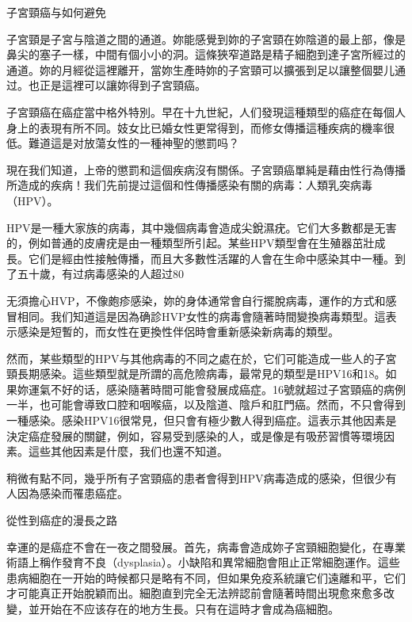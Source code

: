 \documentclass[12pt,UTF8]{ctexbook}
\begin{document}
子宮頸癌与如何避免




子宮頸是子宮与陰道之間的通道。妳能感覺到妳的子宮頸在妳陰道的最上部，像是鼻尖的塞子一樣，中間有個小小的洞。這條狹窄道路是精子細胞到達子宮所經过的通道。妳的月經從這裡離开，當妳生產時妳的子宮頸可以擴張到足以讓整個嬰儿通过。也正是這裡可以讓妳得到子宮頸癌。

子宮頸癌在癌症當中格外特別。早在十九世紀，人们發現這種類型的癌症在每個人身上的表現有所不同。妓女比已婚女性更常得到，而修女傳播這種疾病的機率很低。難道這是对放蕩女性的一種神聖的懲罰吗？

現在我们知道，上帝的懲罰和這個疾病沒有關係。子宮頸癌單純是藉由性行為傳播所造成的疾病！我们先前提过這個和性傳播感染有關的病毒：人類乳突病毒（HPV）。

HPV是一種大家族的病毒，其中幾個病毒會造成尖銳濕疣。它们大多數都是无害的，例如普通的皮膚疣是由一種類型所引起。某些HPV類型會在生殖器茁壯成長。它们是經由性接触傳播，而且大多數性活躍的人會在生命中感染其中一種。到了五十歲，有过病毒感染的人超过80%

无須擔心HVP，不像皰疹感染，妳的身体通常會自行擺脫病毒，運作的方式和感冒相同。我们知道這是因為确診HVP女性的病毒會隨著時間變換病毒類型。這表示感染是短暫的，而女性在更換性伴侶時會重新感染新病毒的類型。

然而，某些類型的HPV与其他病毒的不同之處在於，它们可能造成一些人的子宮頸長期感染。這些類型就是所謂的高危險病毒，最常見的類型是HPV16和18。如果妳運氣不好的话，感染隨著時間可能會發展成癌症。16號就超过子宮頸癌的病例一半，也可能會導致口腔和咽喉癌，以及陰道、陰戶和肛門癌。然而，不只會得到一種感染。感染HPV16很常見，但只會有極少數人得到癌症。這表示其他因素是決定癌症發展的關鍵，例如，容易受到感染的人，或是像是有吸菸習慣等環境因素。這些其他因素是什麼，我们也還不知道。

稍微有點不同，幾乎所有子宮頸癌的患者會得到HPV病毒造成的感染，但很少有人因為感染而罹患癌症。





從性到癌症的漫長之路




幸運的是癌症不會在一夜之間發展。首先，病毒會造成妳子宮頸細胞變化，在專業術語上稱作發育不良（dysplasia）。小缺陷和異常細胞會阻止正常細胞運作。這些患病細胞在一开始的時候都只是略有不同，但如果免疫系統讓它们遠離和平，它们才可能真正开始脫穎而出。細胞直到完全无法辨認前會隨著時間出現愈來愈多改變，並开始在不应该存在的地方生長。只有在這時才會成為癌細胞。
\end{document}
